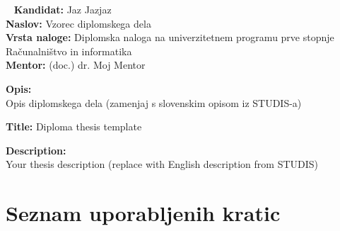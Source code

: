 \documentclass[a4paper,12pt,openright]{book}
\newcommand{\tTitle}{Vzorec diplomskega dela}
\newcommand{\tTitleEn}{Diploma thesis template}
\newcommand{\tAuthor}{Jaz Jazjaz}
\newcommand{\tMentor}{(doc.) dr. Moj Mentor}
\newcommand{\tThesisType}{Diplomska naloga na univerzitetnem programu prve stopnje Računalništvo in informatika}
\newcommand{\clearemptydoublepage}{\newpage{\pagestyle{empty}\cleardoublepage}}
\begin{document}
%
%





%
%
\thispagestyle{empty}
\
\vfill
\bigskip
\noindent\textbf{Kandidat:} \tAuthor \\
\noindent\textbf{Naslov:} \tTitle \\
\noindent\textbf{Vrsta naloge:} \tThesisType \\
\noindent\textbf{Mentor:} \tMentor

\bigskip

\noindent\textbf{Opis:} \\
Opis diplomskega dela (zamenjaj s slovenskim opisom iz STUDIS-a)

\bigskip

\noindent\textbf{Title:} \tTitleEn

\bigskip

\noindent\textbf{Description:} \\
Your thesis description (replace with English description from STUDIS)

\vfill
\clearemptydoublepage


%
%




%
%
\pagestyle{empty}
\def\thepage{}
\tableofcontents{}
\clearemptydoublepage


%
%
\chapter*{Seznam uporabljenih kratic}

\clearemptydoublepage
\end{document}
